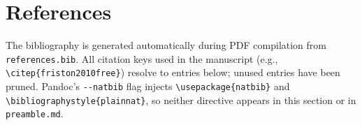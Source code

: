 \documentclass[
  english,
]{article}
\begin{document}
\section{References}\label{references}

The bibliography is generated automatically during PDF compilation from
\texttt{references.bib}. All citation keys used in the manuscript (e.g.,
\texttt{\textbackslash{}citep\{friston2010free\}}) resolve to entries
below; unused entries have been pruned. Pandoc's \texttt{-\/-natbib}
flag injects \texttt{\textbackslash{}usepackage\{natbib\}} and
\texttt{\textbackslash{}bibliographystyle\{plainnat\}}, so neither
directive appears in this section or in \texttt{preamble.md}.

\providecommand{\bibsection}{}
\renewcommand{\bibsection}{}


\end{document}
